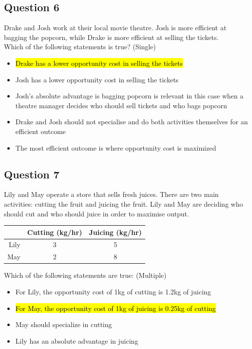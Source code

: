 \subsection{Question 6}
Drake and Josh work at their local movie theatre. Josh is more efficient at bagging the popcorn, while Drake is more efficient at selling the tickets.\\
Which of the following statements is true? (Single)
\begin{itemize}
	\item \hl{Drake has a lower opportunity cost in selling the tickets}
	\item Josh has a lower opportunity cost in selling the tickets
	\item Josh's absolute advantage is bagging popcorn is relevant in this case when a theatre manager decides who should sell tickets and who bags popcorn
	\item Drake and Josh should not specialise and do both activities themselves for an efficient outcome
	\item The most efficient outcome is where opportunity cost is maximized
\end{itemize}

\subsection{Question 7}
Lily and May operate a store that sells fresh juices. There are two main activities: cutting the fruit and juicing the fruit. Lily and May are deciding who should cut and who should juice in order to maximise output.
\begin{table}[H]
	\centering
	\begin{tabular}{r|cc}
		& Cutting (kg/hr) & Juicing (kg/hr)\\\hline
		Lily & 3 & 5\\
		May & 2 & 8
	\end{tabular}
\end{table}
Which of the following statements are true: (Multiple)
\begin{itemize}
	\item For Lily, the opportunity cost of 1kg of cutting is 1.2kg of juicing
	\item\hl{For May, the opportunity cost of 1kg of juicing is 0.25kg of cutting}
	\item May should specialize in cutting
	\item Lily has an absolute advantage in juicing
\end{itemize}

